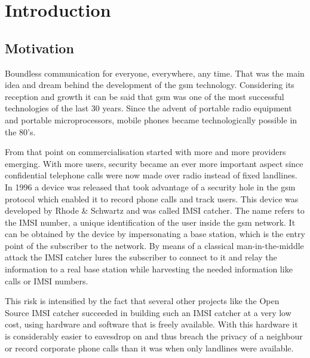 \chapter{Introduction}

\section{Motivation}
Boundless communication for everyone, everywhere, any time.
That was the main idea and dream behind the development of the \gls{gsm} technology.
Considering its reception and growth \cite{GSM2009,GSM_history2011,GSM_stats2011} it can be said that \gls{gsm} was one of the most successful technologies of the last 30 years.
Since the advent of portable radio equipment and portable microprocessors, mobile phones became technologically possible in the 80's.

From that point on commercialisation started with more and more providers emerging.
With more users, security became an ever more important aspect since confidential telephone calls were now made over radio instead of fixed landlines.
In 1996 a device was released that took advantage of a security hole in the \gls{gsm} protocol which enabled it to record phone calls and track users.
This device was developed by Rhode \& Schwartz and was called IMSI catcher.
The name refers to the IMSI number, a unique identification of the user inside the \gls{gsm} network.
It can be obtained by the device by impersonating a base station, which is the entry point of the subscriber to the network.
By means of a classical man-in-the-middle attack the IMSI catcher lures the subscriber to connect to it and relay the information to a real base station while harvesting the needed information like calls or IMSI numbers.

This risk is intensified by the fact that several other projects like the Open Source IMSI catcher \cite{dennis} succeeded in building such an IMSI catcher at a very low cost, using hardware and software that is freely available.
With this hardware it is considerably easier to eavesdrop on and thus breach the privacy of a neighbour or record corporate phone calls than it was when only landlines were available.

